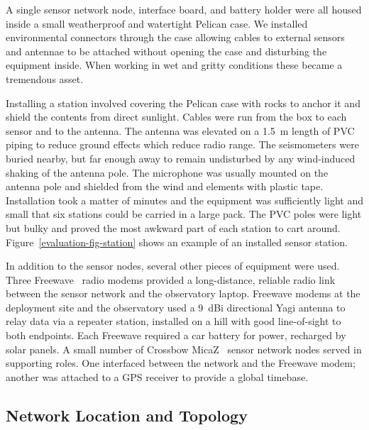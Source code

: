 A single sensor network node, interface board, and battery holder were all
housed inside a small weatherproof and watertight Pelican case. We installed
environmental connectors through the case allowing cables to external sensors
and antennae to be attached without opening the case and disturbing the
equipment inside. When working in wet and gritty conditions these became a
tremendous asset.

Installing a station involved covering the Pelican case with rocks to anchor
it and shield the contents from direct sunlight. Cables were run from the box
to each sensor and to the antenna. The antenna was elevated on a 1.5~m length
of PVC piping to reduce ground effects which reduce radio range. The
seismometers were buried nearby, but far enough away to remain undisturbed by
any wind-induced shaking of the antenna pole. The microphone was usually
mounted on the antenna pole and shielded from the wind and elements with
plastic tape. Installation took a matter of minutes and the equipment was
sufficiently light and small that six stations could be carried in a large
pack. The PVC poles were light but bulky and proved the most awkward part of
each station to cart around. Figure~\ref{evaluation-fig-station} shows an
example of an installed sensor station.

In addition to the sensor nodes, several other pieces of equipment were used.
Three Freewave~\cite{freewave} radio modems provided a long-distance,
reliable radio link between the sensor network and the observatory laptop.
Freewave modems at the deployment site and the observatory used a 9~dBi
directional Yagi antenna to relay data via a repeater station, installed on a
hill with good line-of-sight to both endpoints. Each Freewave required a car
battery for power, recharged by solar panels. A small number of Crossbow
MicaZ~\cite{micaz} sensor network nodes served in supporting roles. One
interfaced between the network and the Freewave modem; another was attached
to a GPS receiver to provide a global timebase.

\subsection{Network Location and Topology}

